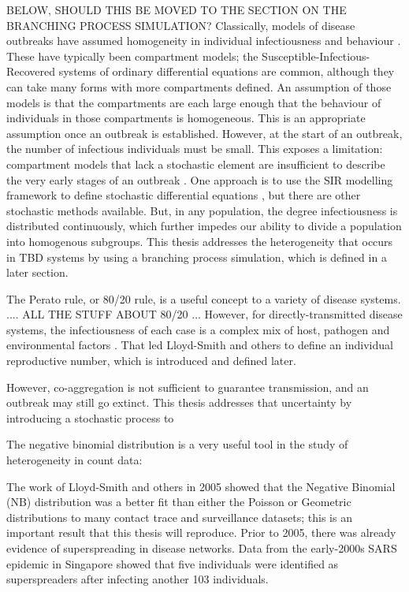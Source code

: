 \documentclass{article}
\begin{document}
BELOW, SHOULD THIS BE MOVED TO THE SECTION ON THE BRANCHING PROCESS SIMULATION? Classically, models of disease outbreaks have assumed homogeneity in individual infectiousness and behaviour \cite{Garske2008}. These have typically been compartment models; the Susceptible-Infectious-Recovered systems of ordinary differential equations are common, although they can take many forms with more compartments defined. An assumption of those models is that the compartments are each large enough that the behaviour of individuals in those compartments is homogeneous. This is an appropriate assumption once an outbreak is established. However, at the start of an outbreak, the number of infectious individuals must be small. This exposes a limitation: compartment models that lack a stochastic element are insufficient to describe the very early stages of an outbreak \cite{Brauer2008a}. One approach is to use the SIR modelling framework to define stochastic differential equations \cite{Allen2017}, but there are other stochastic methods available. But, in any population, the degree infectiousness is distributed continuously, which further impedes our ability to divide a population into homogenous subgroups. This thesis addresses the heterogeneity that occurs in TBD systems by using a branching process simulation, which is defined in a later section.

The Perato rule, or 80/20 rule, is a useful concept to a variety of disease systems. .... ALL THE STUFF ABOUT 80/20 ... However, for directly-transmitted disease systems, the infectiousness of each case is a complex mix of host, pathogen and environmental factors \cite{LloydSmith2005}. That led Lloyd-Smith and others to define an individual reproductive number, which is introduced and defined later.






However, co-aggregation is not sufficient to guarantee transmission, and an outbreak may still go extinct. This thesis addresses that uncertainty by introducing a stochastic process to 

The negative binomial distribution is a very useful tool in the study of heterogeneity in count data: 


The work of Lloyd-Smith and others in 2005 showed that the Negative Binomial (NB) distribution was a better fit than either the Poisson or Geometric distributions to many contact trace and surveillance datasets; this is an important result that this thesis will reproduce. Prior to 2005, there was already evidence of superspreading in disease networks. Data from the early-2000s SARS epidemic in Singapore showed that five individuals were identified as superspreaders \cite{CDC2003} after infecting another 103 individuals.
\end{document}
